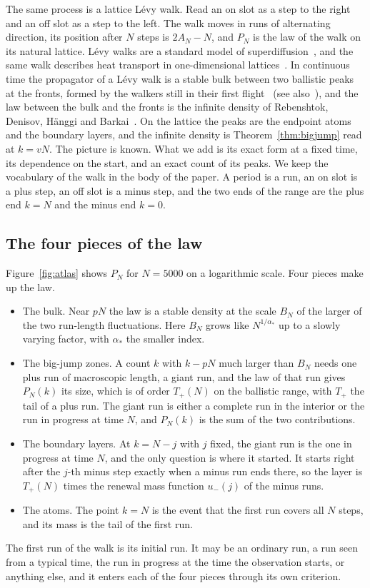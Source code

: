 The same process is a lattice L\'evy walk. Read an on slot as a step to the right and an off
slot as a step to the left. The walk moves in runs of alternating direction, its position
after $N$ steps is $2A_N-N$, and $P_N$ is the law of the walk on its natural lattice. L\'evy
walks are a standard model of superdiffusion~\cite{zdk2015}, and the same walk describes heat
transport in one-dimensional lattices~\cite{dsd2013,wlh2016}. In continuous time the propagator
of a L\'evy walk is a stable bulk between two ballistic peaks at the fronts, formed by the
walkers still in their first flight~\cite[Section~II.A.2 and Fig.~2]{zdk2015} (see
also~\cite{zdh2011,dzh2012}), and the law between the bulk and the fronts is the infinite
density of Rebenshtok, Denisov, H\"anggi and Barkai~\cite{rdhb2014,rdhb2014b}. On the lattice
the peaks are the endpoint atoms and the boundary layers, and the infinite density is
Theorem~\ref{thm:bigjump} read at $k=vN$. The picture is known. What we add is its exact
form at a fixed time, its dependence on the start, and an exact count of its peaks. We keep
the vocabulary of the walk in the body of the paper. A period is a run, an on slot is a plus
step, an off slot is a minus step, and the two ends of the range are the plus end $k=N$ and
the minus end $k=0$.

\subsection{The four pieces of the law}\label{sec:intro-picture}

Figure~\ref{fig:atlas} shows $P_N$ for $N=5000$ on a logarithmic scale. Four pieces make up
the law.
\begin{itemize}[nosep]
\item The bulk. Near $pN$ the law is a stable density at the scale $B_N$ of the larger of
the two run-length fluctuations. Here $B_N$ grows like $N^{1/\alpha_*}$ up to a slowly
varying factor, with $\alpha_*$ the smaller index.
\item The big-jump zones. A count $k$ with $k-pN$ much larger than $B_N$ needs one plus run
of macroscopic length, a giant run, and the law of that run gives $P_N(k)$ its size, which is
of order $T_\plus(N)$ on the ballistic range, with $T_\plus$ the tail of a plus run. The giant
run is either a complete run in the interior or the run in progress at time $N$, and
$P_N(k)$ is the sum of the two contributions.
\item The boundary layers. At $k=N-j$ with $j$ fixed, the giant run is the one in progress at
time $N$, and the only question is where it started. It starts right after the $j$-th minus
step exactly when a minus run ends there, so the layer is $T_\plus(N)$ times the renewal mass
function $u_\minus(j)$ of the minus runs.
\item The atoms. The point $k=N$ is the event that the first run covers all $N$ steps, and
its mass is the tail of the first run.
\end{itemize}
The first run of the walk is its initial run. It may be an ordinary run, a run seen from a
typical time, the run in progress at the time the observation starts, or anything else, and
it enters each of the four pieces through its own criterion.

